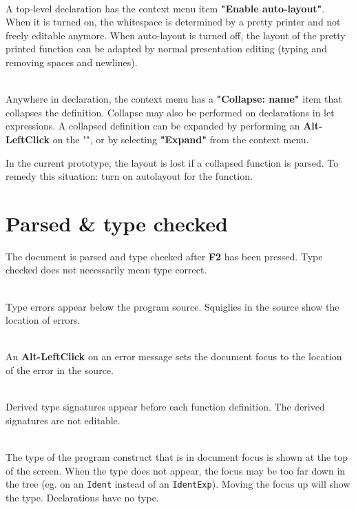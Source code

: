 \documentclass{article}
\begin{document}
\bigskip 
{}\\
A top-level declaration has the context menu item {\bf "Enable auto-layout"}. When it is turned on, the whitespace is determined by a pretty printer and not freely editable anymore. When auto-layout is turned off, the layout of the pretty printed function can be adapted by normal presentation editing (typing and removing spaces and newlines).

\bigskip 
{}\\
Anywhere in declaration, the context menu has a {\bf "Collapse: name"} item that collapses the definition. Collapse may also be performed on declarations in let expressions. A collapsed definition can be expanded by performing an {\bf Alt-LeftClick} on the "", or by selecting {\bf "Expand"} from the context menu.

In the current prototype, the layout is lost if a collapsed function is parsed. To remedy this situation: turn on autolayout for the function.

\section{Parsed \& type checked}
The document is parsed and type checked after {\bf F2} has been pressed. Type checked does not necessarily mean type correct.
 
\bigskip 
{}\\
Type errors appear below the program source. Squiglies in the source show the location of errors. 

\bigskip 
{}\\
An {\bf Alt-LeftClick} on an error message sets the document focus to the location of the error in the source.

\bigskip 
{}\\
Derived type signatures appear before each function definition. The derived signatures are not editable.

\bigskip 
{}\\
The type of the program construct that is in document focus is shown at the top of the screen. When the type does not appear, the focus may be too far down in the tree (eg. on an {\tt Ident} instead of an {\tt IdentExp}). Moving the focus up will show the type. Declarations have no type.
\end{document}
